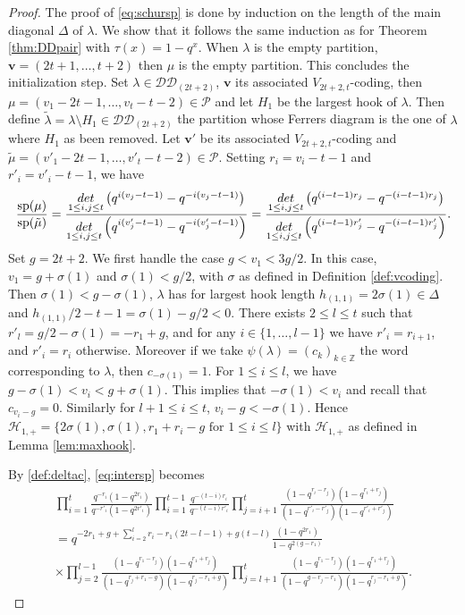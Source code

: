 \documentclass[11pt,letterpaper]{amsart}
\def\bbbz{\mathbb Z}
\def\cch{\mathcal H}
\def\ccdd{\mathcal {DD}}
\def\ccp{\mathcal P}
\def\det{{\rm det}}
\renewcommand{\sp}{\mathrm{sp}}
\numberwithin{equation}{section}
\numberwithin{df}{section}
\begin{document}
\begin{proof}
The proof of \eqref{eq:schursp} is done by induction on the length of the main diagonal $\Delta$ of $\lambda$. We show that it follows the same induction as for Theorem \ref{thm:DDpair} with $\tau(x)=1-q^x$. 
When $\lambda$ is the empty partition, $\mathbf{v}=(2t+1,\dots,t+2)$ then $\mu$ is the empty partition. This concludes the initialization step.
Set $\lambda\in\ccdd_{(2t+2)}$, $\mathbf{v}$ its associated $V_{2t+2,t}$-coding, then $\mu=(v_1-2t-1,\dots,v_t-t-2)\in\ccp$ and let $H_1$ be the largest hook of $\lambda$. Then define $\tilde{\lambda}=\lambda\setminus H_1\in\ccdd_{(2t+2)}$ the partition whose Ferrers diagram is the one of $\lambda$ where $H_1$ as been removed. Let $\mathbf{v'}$ be its associated $V_{2t+2,t}$-coding and $\tilde{\mu}=(v'_1-2t-1,\dots,v'_t-t-2)\in\ccp$. Setting $r_i=v_i-t-1$ and $r'_i=v'_i-t-1$, we have
\begin{equation}\label{eq:intersp}
\frac{\sp(\mu)}{\sp(\tilde{\mu})}=\frac{\underset{1\le i,j\le t}{\det}\left(q^{i(v_j-t-1)}-q^{-i(v_j-t-1)}\right)}{\underset{1\le i,j\le t}{\det}\left(q^{i(v'_j-t-1)}-q^{-i(v'_j-t-1)}\right)}=\frac{\underset{1\le i,j\le t}{\det}\left(q^{(i-t-1)r_j}-q^{-(i-t-1)r_j}\right)}{\underset{1\le i,j\le t}{\det}\left(q^{(i-t-1)r'_j}-q^{-(i-t-1)r'_j}\right)}.
\end{equation}
Set $g=2t+2$. We first handle the case $g<v_1<3g/2$. In this case, $v_1=g+\sigma(1)$ and $\sigma(1)<g/2$, with $\sigma$ as defined in Definition \ref{def:vcoding}. Then $\sigma(1)<g-\sigma(1)$, $\lambda$ has for largest hook length $h_{(1,1)}=2\sigma(1)\in\Delta$ and $h_{(1,1)}/2-t-1=\sigma(1)-g/2<0$. There exists $2\leq l\leq t$ such that $r'_l=g/2-\sigma(1)=-r_1+g$, and for any $i\in\lbrace 1,\dots,l-1\rbrace$ we have $r'_i=r_{i+1}$, and $r'_i=r_i$ otherwise. Moreover if we take $\psi(\lambda)=(c_k)_{k\in\bbbz}$ the word corresponding to $\lambda$, then $c_{-\sigma(1)}=1$. For $1\leq i\leq l$, we have $g-\sigma(1)<v_i<g+\sigma(1)$. This implies that $-\sigma(1)<v_i$ and recall that $c_{v_i-g}=0$. Similarly for $l+1\leq i\leq t$, $v_i-g<-\sigma(1)$. Hence $\cch_{1,+}=\lbrace 2\sigma(1),\sigma(1), r_1+r_i-g \text{ for } 1\leq i\leq l\rbrace$ with $\cch_{1,+}$ as defined in Lemma \ref{lem:maxhook}.

By \eqref{def:deltac}, \eqref{eq:intersp} becomes
\begin{multline}\label{eq:premiercas}
\prod_{i=1}^t\frac{q^{-r_i}(1-q^{2r_i})}{q^{-r'_i}(1-q^{2r'_i})}\prod_{i=1}^{t-1}\frac{q^{-(t-i)r_i}}{q^{-(t-i)r'_i}}\prod_{j=i+1}^{t}\frac{(1-q^{r_i-r_j})(1-q^{r_i+r_j})}{(1-q^{r'_i-r'_j})(1-q^{r'_i+r'_j})}\\
=q^{-2r_1+g+\sum_{i=2}^l r_i-r_1(2t-l-1)+g(t-l)}\frac{(1-q^{2r_1})}{1-q^{2(g-r_1)}}\\
\times\prod_{j=2}^{l-1}\frac{(1-q^{r_1-r_j})(1-q^{r_1+r_j})}{(1-q^{r_j+r_1-g})(1-q^{r_j-r_1+g})}\prod_{j=l+1}^{t}\frac{(1-q^{r_1-r_j})(1-q^{r_1+r_j})}{(1-q^{g-r_j-r_1})(1-q^{r_j-r_1+g})}.
\end{multline}


\end{proof}
\end{document}
